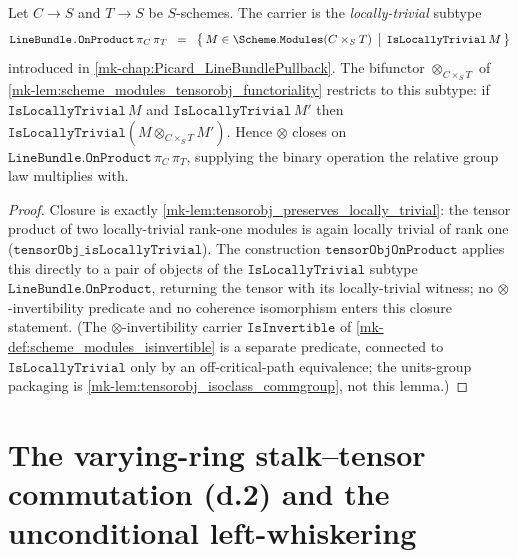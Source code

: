 \begin{lemma}\label{mk-lem:tensorobj_lift_onproduct}
  \leanok

  Let \(C \to S\) and \(T \to S\) be \(S\)-schemes. The carrier is the
  \emph{locally-trivial} subtype
  \[
    \texttt{LineBundle.OnProduct}\,\pi_C\,\pi_T
    \;\;=\;\;
    \bigl\{\,M \in \Scheme.\mathtt{Modules}(C \times_S T)
            \,\bigm|\, \mathtt{IsLocallyTrivial}\,M \,\bigr\}
  \]
  introduced in \ref{mk-chap:Picard_LineBundlePullback}. The bifunctor
  \(\otimes_{C \times_S T}\) of
  \ref{mk-lem:scheme_modules_tensorobj_functoriality} restricts to this subtype:
  if \(\mathtt{IsLocallyTrivial}\,M\) and \(\mathtt{IsLocallyTrivial}\,M'\) then
  \(\mathtt{IsLocallyTrivial}(M \otimes_{C \times_S T} M')\). Hence \(\otimes\)
  closes on \(\texttt{LineBundle.OnProduct}\,\pi_C\,\pi_T\), supplying the binary
  operation the relative group law multiplies with.
\end{lemma}

\begin{proof}
  \leanok
  Closure is exactly
  \ref{mk-lem:tensorobj_preserves_locally_trivial}: the tensor product of two
  locally-trivial rank-one modules is again locally trivial of rank one
  (\(\mathtt{tensorObj\_isLocallyTrivial}\)). The construction
  \(\mathtt{tensorObjOnProduct}\) applies this directly to a pair of objects of
  the \(\mathtt{IsLocallyTrivial}\) subtype \(\texttt{LineBundle.OnProduct}\),
  returning the tensor with its locally-trivial witness; no
  \(\otimes\)-invertibility predicate and no coherence isomorphism enters this
  closure statement. (The \(\otimes\)-invertibility carrier
  \(\mathtt{IsInvertible}\) of \ref{mk-def:scheme_modules_isinvertible} is a
  separate predicate, connected to \(\mathtt{IsLocallyTrivial}\) only by an
  off-critical-path equivalence; the units-group packaging is
  \ref{mk-lem:tensorobj_isoclass_commgroup}, not this lemma.)
\end{proof}

\section{The varying-ring stalk--tensor commutation (d.2) and the unconditional
left-whiskering}
\label{mk-sec:tensorobj_stalk_tensor}


